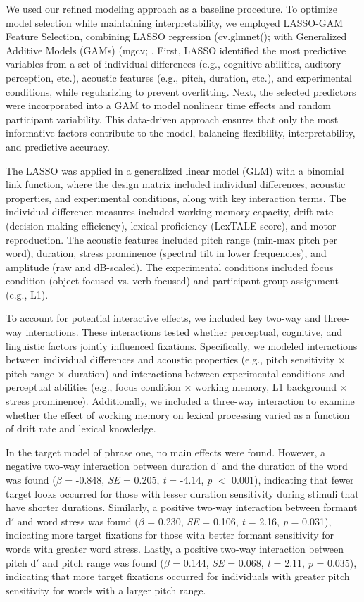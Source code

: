 We used our refined modeling approach as a baseline procedure. To optimize model selection while maintaining interpretability, we employed LASSO-GAM Feature Selection, combining LASSO regression (cv.glmnet(); \parencite{Friedman2010} with Generalized Additive Models (GAMs) (mgcv; \parencite{Wood2017}. First, LASSO identified the most predictive variables from a set of individual differences (e.g., cognitive abilities, auditory perception, etc.), acoustic features (e.g., pitch, duration, etc.), and experimental conditions, while regularizing to prevent overfitting. Next, the selected predictors were incorporated into a GAM to model nonlinear time effects and random participant variability. This data-driven approach ensures that only the most informative factors contribute to the model, balancing flexibility, interpretability, and predictive accuracy.

The LASSO was applied in a generalized linear model (GLM) with a binomial link function, where the design matrix included individual differences, acoustic properties, and experimental conditions, along with key interaction terms. The individual difference measures included working memory capacity, drift rate (decision-making efficiency), lexical proficiency (LexTALE score), and motor reproduction. The acoustic features included pitch range (min-max pitch per word), duration, stress prominence (spectral tilt in lower frequencies), and amplitude (raw and dB-scaled). The experimental conditions included focus condition (object-focused vs. verb-focused) and participant group assignment (e.g., L1).

To account for potential interactive effects, we included key two-way and three-way interactions. These interactions tested whether perceptual, cognitive, and linguistic factors jointly influenced fixations. Specifically, we modeled interactions between individual differences and acoustic properties (e.g., pitch sensitivity × pitch range × duration) and interactions between experimental conditions and perceptual abilities (e.g., focus condition × working memory, L1 background × stress prominence). Additionally, we included a three-way interaction to examine whether the effect of working memory on lexical processing varied as a function of drift rate and lexical knowledge.

In the target model of phrase one, no main effects were found. However, a negative two-way interaction between duration d' and the duration of the word was found ($\beta$ = -0.848, \textit{SE} = 0.205, \textit{t} = -4.14, \textit{p} $<$ 0.001), indicating that fewer target looks occurred for those with lesser duration sensitivity during stimuli that have shorter durations. Similarly, a positive two-way interaction between formant d$'$ and word stress was found ($\beta$ = 0.230, \textit{SE} = 0.106, \textit{t} = 2.16, \textit{p} = 0.031), indicating more target fixations for those with better formant sensitivity for words with greater word stress. Lastly, a positive two-way interaction between pitch d$'$ and pitch range was found ($\beta$ = 0.144, \textit{SE} = 0.068, \textit{t} = 2.11, \textit{p} = 0.035), indicating that more target fixations occurred for individuals with greater pitch sensitivity for words with a larger pitch range.

